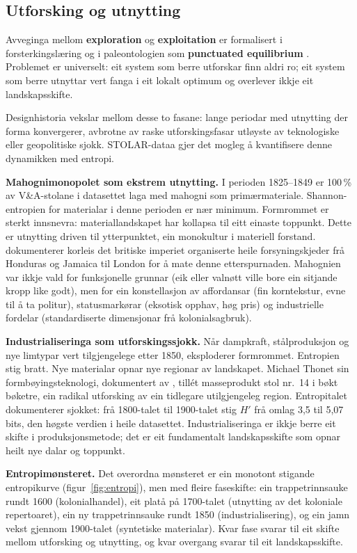 \documentclass[10pt, a4paper, twocolumn]{article}
\begin{document}
\subsection{Utforsking og utnytting}

Avveginga mellom \textbf{exploration} og \textbf{exploitation} er formalisert i forsterkingslæring \citep{sutton2018} og i paleontologien som \textbf{punctuated equilibrium} \citep{eldredge1972}. Problemet er universelt: eit system som berre utforskar finn aldri ro; eit system som berre utnyttar vert fanga i eit lokalt optimum og overlever ikkje eit landskapsskifte.

Designhistoria vekslar mellom desse to fasane: lange periodar med utnytting der forma konvergerer, avbrotne av raske utforskingsfasar utløyste av teknologiske eller geopolitiske sjokk. STOLAR-dataa gjer det mogleg å kvantifisere denne dynamikken med entropi.

\textbf{Mahognimonopolet som ekstrem utnytting.} I perioden 1825--1849 er 100\,\% av V\&A-stolane i datasettet laga med mahogni som primærmateriale. Shannon-entropien for materialar i denne perioden er nær minimum. Formrommet er sterkt innsnevra: materiallandskapet har kollapsa til eitt einaste toppunkt. Dette er utnytting driven til ytterpunktet, ein monokultur i materiell forstand. \citet{anderson1995} dokumenterer korleis det britiske imperiet organiserte heile forsyningskjeder frå Honduras og Jamaica til London for å mate denne etterspurnaden. Mahognien var ikkje vald for funksjonelle grunnar (eik eller valnøtt ville bore ein sitjande kropp like godt), men for ein konstellasjon av affordansar (fin korntekstur, evne til å ta politur), statusmarkørar (eksotisk opphav, høg pris) og industrielle fordelar (standardiserte dimensjonar frå kolonialsagbruk).

\textbf{Industrialiseringa som utforskingssjokk.} Når dampkraft, stålproduksjon og nye limtypar vert tilgjengelege etter 1850, eksploderer formrommet. Entropien stig bratt. Nye materialar opnar nye regionar av landskapet. Michael Thonet sin formbøyingsteknologi, dokumentert av \citet{thonet1976}, tillét masseprodukt stol nr.~14 i bøkt bøketre, ein radikal utforsking av ein tidlegare utilgjengeleg region. Entropitalet dokumenterer sjokket: frå 1800-talet til 1900-talet stig $H'$ frå omlag 3,5 til 5,07 bits, den høgste verdien i heile datasettet. Industrialiseringa er ikkje berre eit skifte i produksjonsmetode; det er eit fundamentalt landskapsskifte som opnar heilt nye dalar og toppunkt.

\textbf{Entropimønsteret.} Det overordna mønsteret er ein monotont stigande entropikurve (figur~\ref{fig:entropi}), men med fleire faseskifte: ein trappetrinnsauke rundt 1600 (kolonialhandel), eit platå på 1700-talet (utnytting av det koloniale repertoaret), ein ny trappetrinnsauke rundt 1850 (industrialisering), og ein jamn vekst gjennom 1900-talet (syntetiske materialar). Kvar fase svarar til eit skifte mellom utforsking og utnytting, og kvar overgang svarar til eit landskapsskifte.
\end{document}
